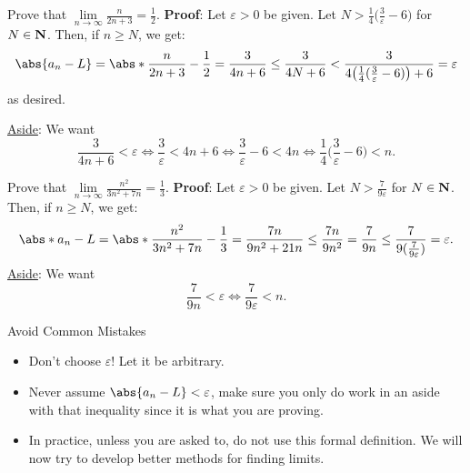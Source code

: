 \begin{Example}{}{}
    Prove that $ \lim\limits_{{n} \to {\infty}}\frac{n}{2n+3}=\frac{1}{2} $.
    \tcblower{}
    \textbf{Proof}: Let $ \varepsilon>0 $ be given. Let $ N>\frac{1}{4}\bigl(\frac{3}{\varepsilon}-6\bigr) $ for $ N\in\mathbf{N} $.
    Then, if $ n\ge N $, we get:
    \[ \abs{a_n-L}=\abs*{\frac{n}{2n+3}-\frac{1}{2}}=\frac{3}{4n+6}\le \frac{3}{4N+6}<\frac{3}{4\bigl(\frac{1}{4}(\frac{3}{\varepsilon}-6)\bigr)+6}=\varepsilon \]
    as desired.

    \underline{Aside}: We want
    \[ \frac{3}{4n+6}<\varepsilon\iff \frac{3}{\varepsilon}<4n+6\iff \frac{3}{\varepsilon}-6<4n\iff \frac{1}{4}\biggl(\frac{3}{\varepsilon}-6\biggr)<n. \]
\end{Example}
\begin{Example}{}{}
    Prove that $ \lim\limits_{{n} \to {\infty}}\frac{n^2}{3n^2+7n}=\frac{1}{3} $.
    \tcblower{}
    \textbf{Proof}: Let $ \varepsilon>0 $ be given. Let $ N>\frac{7}{9\varepsilon} $ for $ N\in\mathbf{N} $.
    Then, if $ n\ge N $, we get:
    \[ \abs*{a_n-L}=\abs*{\frac{n^2}{3n^2+7n}-\frac{1}{3}}=\frac{7n}{9n^2+21n}\le \frac{7n}{9n^2}=\frac{7}{9n}\le \frac{7}{9(\frac{7}{9\varepsilon})}=\varepsilon. \]
    \underline{Aside}: We want
    \[ \frac{7}{9n}<\varepsilon\iff \frac{7}{9\varepsilon}<n. \]
\end{Example}
\begin{Remark}{Avoid Common Mistakes}{}
    \begin{itemize}
        \item Don't choose $ \varepsilon $! Let it be arbitrary.
        \item Never assume $ \abs{a_n-L}<\varepsilon $, make sure you only do work in an aside with that inequality since it is what you
              are proving.
        \item In practice, unless you are asked to, do not use this formal definition. We will now try to develop better methods for finding limits.
    \end{itemize}
\end{Remark}
